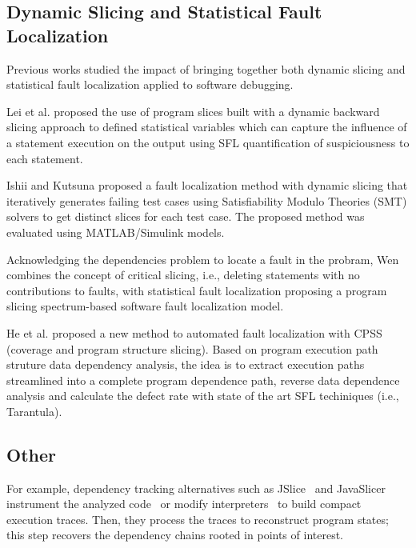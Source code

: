 \documentclass[sigplan,10pt,review,anonymous]{acmart}\settopmatter{printfolios=true,printccs=false,printacmref=false}
\begin{document}

\subsection{Dynamic Slicing and Statistical Fault Localization}

Previous works studied the impact of bringing together both dynamic
slicing and statistical fault localization applied to software
debugging.

Lei et al. proposed the use of program slices built with a
dynamic backward slicing approach to defined statistical variables
which can capture the influence of a statement execution on the output
using SFL quantification of suspiciousness to each statement\cite{lei-mao-dai-wang-2012}.

Ishii and Kutsuna proposed a fault localization method with dynamic slicing that iteratively generates failing test cases using Satisfiability Modulo Theories (SMT) solvers to get distinct slices
for each test case. The proposed method was evaluated using MATLAB/Simulink models\cite{ishii-kutsuna-2016}.

Acknowledging the dependencies problem to locate a fault in the probram, Wen\cite{wen-2012} combines the concept of critical slicing, i.e., deleting statements with no contributions to faults,
with statistical fault localization proposing a program slicing spectrum-based software fault localization model.

He et al. proposed a new method to automated fault localization with
CPSS (coverage and program structure slicing)\cite{he-zhang-liu-gao-201}.  Based on program
execution path struture data dependency analysis, the idea is to
extract execution paths streamlined into a complete program dependence
path, reverse data dependence analysis and calculate the defect rate
with state of the art SFL techiniques (i.e., Tarantula).

\subsection{Other}


For example,
dependency tracking alternatives such as
JSlice~\cite{Wang:2004:UCB:998675.999455} and
JavaSlicer~\cite{hammacher-bachthesis-2008} instrument the analyzed
code~\cite{hammacher-bachthesis-2008} or modify
interpreters~\cite{Wang:2004:UCB:998675.999455} to build compact
execution traces.  Then, they process the traces to reconstruct
program states; this step recovers the dependency chains rooted in
points of interest.
\end{document}
